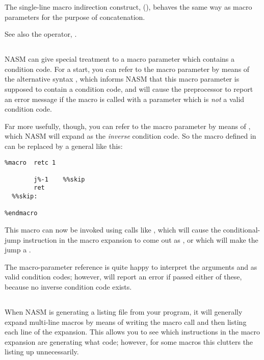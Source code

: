 The single-line macro indirection construct, \code{\%[...]}
(), behaves the same way as macro
parameters for the purpose of concatenation.

See also the \code{\%+} operator, .

\subsection{}
\label{subsec:mlmaccc}

NASM can give special treatment to a macro parameter which contains
a condition code. For a start, you can refer to the macro parameter
 by means of the alternative syntax ,
which informs NASM that this macro parameter is supposed to contain
a condition code, and will cause the preprocessor to report an
error message if the macro is called with a parameter which is
\emph{not} a valid condition code.

Far more usefully, though, you can refer to the macro parameter by
means of , which NASM will expand as the \emph{inverse}
condition code. So the  macro defined in 
can be replaced by a general  like this:

\begin{lstlisting}
%macro  retc 1

        j%-1    %%skip
        ret
  %%skip:

%endmacro
\end{lstlisting}

This macro can now be invoked using calls like , which
will cause the conditional-jump instruction in the macro expansion
to come out as , or  which will make the jump a
.

The  macro-parameter reference is quite happy to interpret
the arguments  and  as valid condition codes;
however,  will report an error if passed either of these,
because no inverse condition code exists.

\subsection{}
\label{subsec:nolist}

When NASM is generating a listing file from your program, it will
generally expand multi-line macros by means of writing the macro
call and then listing each line of the expansion. This allows you to
see which instructions in the macro expansion are generating what
code; however, for some macros this clutters the listing up
unnecessarily.

